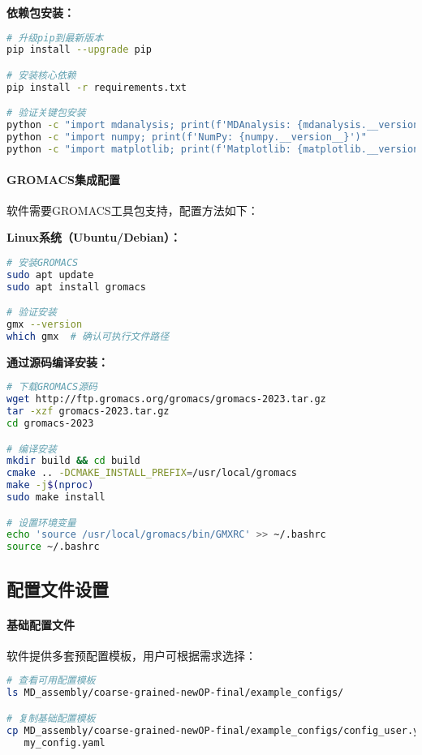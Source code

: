 \textbf{依赖包安装：}
\begin{lstlisting}[language=bash,style=blockstyle]
# 升级pip到最新版本
pip install --upgrade pip

# 安装核心依赖
pip install -r requirements.txt

# 验证关键包安装
python -c "import mdanalysis; print(f'MDAnalysis: {mdanalysis.__version__}')"
python -c "import numpy; print(f'NumPy: {numpy.__version__}')"
python -c "import matplotlib; print(f'Matplotlib: {matplotlib.__version__}')"
\end{lstlisting}

\paragraph{GROMACS集成配置}

软件需要GROMACS工具包支持，配置方法如下：

\textbf{Linux系统（Ubuntu/Debian）：}
\begin{lstlisting}[language=bash,style=blockstyle]
# 安装GROMACS
sudo apt update
sudo apt install gromacs

# 验证安装
gmx --version
which gmx  # 确认可执行文件路径
\end{lstlisting}

\textbf{通过源码编译安装：}
\begin{lstlisting}[language=bash,style=blockstyle]
# 下载GROMACS源码
wget http://ftp.gromacs.org/gromacs/gromacs-2023.tar.gz
tar -xzf gromacs-2023.tar.gz
cd gromacs-2023

# 编译安装
mkdir build && cd build
cmake .. -DCMAKE_INSTALL_PREFIX=/usr/local/gromacs
make -j$(nproc)
sudo make install

# 设置环境变量
echo 'source /usr/local/gromacs/bin/GMXRC' >> ~/.bashrc
source ~/.bashrc
\end{lstlisting}

\subsection{配置文件设置}
\label{subsec:configuration_setup}

\paragraph{基础配置文件}

软件提供多套预配置模板，用户可根据需求选择：

\begin{lstlisting}[language=bash,style=blockstyle]
# 查看可用配置模板
ls MD_assembly/coarse-grained-newOP-final/example_configs/

# 复制基础配置模板
cp MD_assembly/coarse-grained-newOP-final/example_configs/config_user.yaml \
   my_config.yaml
\end{lstlisting}

